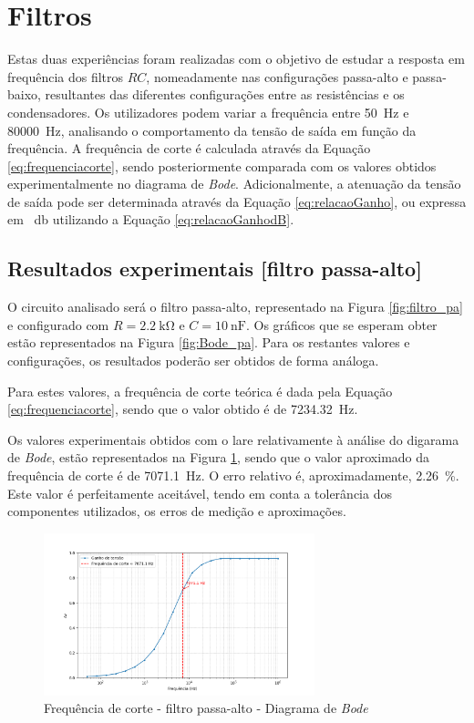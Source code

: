 \section{Filtros}
\label{sec:resultados_filtros}
Estas duas experiências foram realizadas com o objetivo de estudar a resposta em frequência dos filtros $RC$, nomeadamente nas configurações passa-alto e passa-baixo, resultantes das diferentes configurações entre as resistências e os condensadores. Os utilizadores podem variar a frequência entre \SI{50}{\hertz} e \SI{80000}{\hertz}, analisando o comportamento da tensão de saída em função da frequência. A frequência de corte é calculada através da Equação \ref{eq:frequenciacorte}, sendo posteriormente comparada com os valores obtidos experimentalmente no diagrama de \textit{Bode}. Adicionalmente, a atenuação da tensão de saída pode ser determinada através da Equação \ref{eq:relacaoGanho}, ou expressa em \SI{}{\decibel} utilizando a Equação \ref{eq:relacaoGanhodB}.

\subsection{Resultados experimentais [filtro passa-alto]}
\label{sec:resultados_filtros_passaalto}
O circuito analisado será o filtro passa-alto, representado na Figura \ref{fig:filtro_pa} e configurado com $R=\SI{2.2}{\kilo\ohm}$ e $C=\SI{10}{\nano\farad}$. Os gráficos que se esperam obter estão representados na Figura \ref{fig:Bode_pa}. Para os restantes valores e configurações, os resultados poderão ser obtidos de forma análoga.

Para estes valores, a frequência de corte teórica é dada pela Equação \ref{eq:frequenciacorte}, sendo que o valor obtido é de \SI{7234.32}{\hertz}.

Os valores experimentais obtidos com o \acrshort{lare} relativamente à análise do digarama de \textit{Bode}, estão representados na Figura \ref{fig:fcBode}, sendo que o valor aproximado da frequência de corte é de \SI{7071.1}{\hertz}. O erro relativo é, aproximadamente, \SI{2.26}{\percent}. Este valor é perfeitamente aceitável, tendo em conta a tolerância dos componentes utilizados, os erros de medição e aproximações.

\begin{figure}[hbtp]
	\centering
	\includegraphics[width=0.7\textwidth]{figures/bode_hpf_fc.png}
	\caption{Frequência de corte - filtro passa-alto - Diagrama de \textit{Bode}}
	\label{fig:fcBode}
\end{figure}

